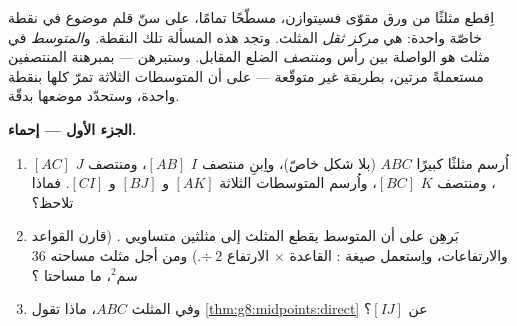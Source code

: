 \begin{problem}
\label{pb:g8:midpoints:1}
اِقطع مثلثًا من ورق مقوّى فسيتوازن، مسطّحًا تمامًا،
على سنّ قلم موضوع في نقطة خاصّة واحدة: هي
\emph{مركز ثقل} المثلث.
وتجد هذه المسألة تلك النقطة. و\emph{المتوسط} في
مثلث هو  الواصلة بين رأس و\emph{منتصف}
الضلع المقابل. وستبرهن --- بمبرهنة المنتصفين
مستعملةً مرتين، بطريقة غير متوقّعة --- على أن المتوسطات الثلاثة
تمرّ كلها بنقطة واحدة، وستحدّد موضعها بدقّة.

\medskip
\noindent\textbf{الجزء الأول --- إحماء.}
\begin{enumerate}
  \item اُرسم مثلثًا كبيرًا $ABC$ (بلا شكل خاصّ)، واِبنِ
        منتصف $I$  $[AB]$، ومنتصف $J$  $[AC]$، ومنتصف $K$
         $[BC]$، واُرسم المتوسطات الثلاثة $[AK]$ و $[BJ]$ و $[CI]$.
        فماذا تلاحظ؟
  \item بَرهِن على أن المتوسط يقطع المثلث إلى مثلثين
        متساويي . (قارن القواعد والارتفاعات، واِستعمل
        صيغة : القاعدة $\times$ الارتفاع $\div\ 2$.) ومن أجل
        مثلث مساحته $36$ سم$^2$، ما مساحتا
        ؟
  \item وفي المثلث $ABC$، ماذا تقول
        \cref{thm:g8:midpoints:direct} عن 
        $[IJ]$؟
\end{enumerate}


\end{problem}
